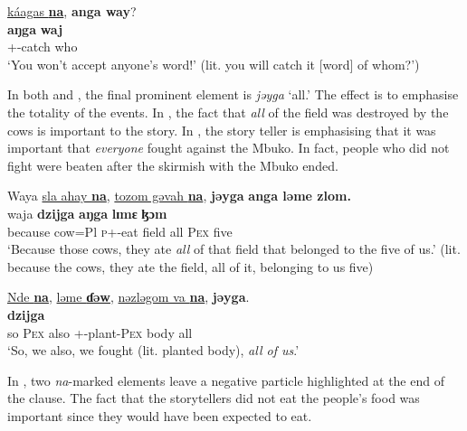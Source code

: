 \medskip
\underline{k\'{a}agas  \textbf{na}},  \textbf{anga  way}?\\ 
\gll {}  \textbf{aŋga}      \textbf{waj}\\
     {\twoS}+{\POT}-catch  {\PSP} {\POSS}    who\\
\glt ‘You won't accept anyone's word!' (lit. you will catch it [word] of whom?’) \\ 
\z

In both  and , the final prominent element is \textit{jəyga}  ‘all.’ The effect is to emphasise the totality of the events. In , the fact that \textit{all} of the field was destroyed by the cows is important to the story. In , the story teller is emphasising that it was important that \textit{everyone} fought against the Mbuko. In fact, people who did not fight were beaten after the skirmish with the Mbuko ended.

\ea \label{ex:11:48}
Waya  \underline{sla  ahay  \textbf{na}},  \underline{tozom  gəvah  \textbf{na}}, \textbf{jəyga}   \textbf{anga  ləme  zlom.}\\
\gll  waja           \textbf{{dzijga}}  \textbf{aŋga}    \textbf{lɪmɛ}      \textbf{ɮɔm}\\
      because  cow=Pl  {\PSP}  \textsc{p}+{\PFV}-eat   field   {\PSP}      all      {\POSS}    \textsc{Pex}   five \\
\glt  ‘Because those cows, they ate \textit{all} of that field that belonged to the five of us.’ (lit. because the cows, they ate the field, all of it, belonging to us five)
\z

\ea \label{ex:11:49}
\underline{Nde  \textbf{na}},  \underline{ləme  \textbf{ɗəw}},  \underline{nəzləgom  va  \textbf{na}},  \textbf{jəyga}.\\
\gll  {}                      \textbf{dzijga}\\
     so   {\PSP}  \textsc{Pex}  also  {\oneS}+{\PFV}-plant-\textsc{Pex}  body  {\PSP}  all\\
\glt  ‘So, we also, we fought (lit. planted body), \textit{all of us}.’
\z

In , two \textit{na}{}-marked elements leave a negative particle highlighted at the end of the clause. The fact that the storytellers did not eat the people’s food was important since they would have been expected to eat.

